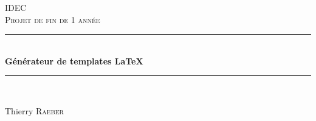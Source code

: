 \begin{titlepage}

\newcommand{\HRule}{\rule{\linewidth}{0.5mm}} %

\center %


\textsc{\LARGE IDEC}\\[1.5cm] %
\textsc{\Large Projet de fin de 1 année}\\[0.5cm] %


\HRule \\[0.4cm]
{ \huge \bfseries Générateur de templates \LaTeX{}}\\[0.4cm] %
\HRule \\[1.5cm]


\begin{minipage}{\textwidth}
\begin{center} \large
Thierry \textsc{Raeber} %
\end{center}
\end{minipage}\\[4cm]



\end{titlepage}
